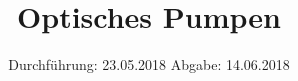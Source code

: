 

\subject{V21}
\title{Optisches Pumpen}
\date{
  Durchführung: 23.05.2018
  \hspace{3em}
  Abgabe: 14.06.2018
}



\maketitle
\newpage

%
%


%



\printbibliography


